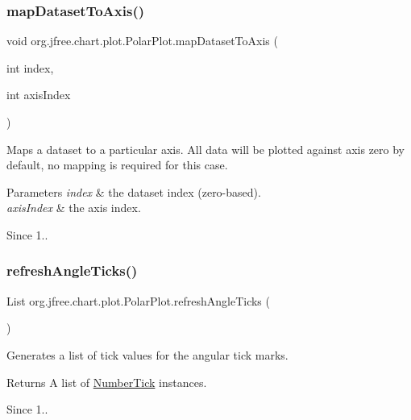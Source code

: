 \subsubsection{\texorpdfstring{map\+Dataset\+To\+Axis()}{mapDatasetToAxis()}}
{\footnotesize\ttfamily void org.\+jfree.\+chart.\+plot.\+Polar\+Plot.\+map\+Dataset\+To\+Axis (\begin{DoxyParamCaption}\item[{int}]{index,  }\item[{int}]{axis\+Index }\end{DoxyParamCaption})}

Maps a dataset to a particular axis. All data will be plotted against axis zero by default, no mapping is required for this case.


\begin{DoxyParams}{Parameters}
{\em index} & the dataset index (zero-\/based). \\
\hline
{\em axis\+Index} & the axis index.\\
\hline
\end{DoxyParams}
\begin{DoxySince}{Since}
1.. 
\end{DoxySince}
\mbox{\label{classorg_1_1jfree_1_1chart_1_1plot_1_1_polar_plot_a051265d6d552b2c20c6baac9fb02dcbe}} 
\subsubsection{\texorpdfstring{refresh\+Angle\+Ticks()}{refreshAngleTicks()}}
{\footnotesize\ttfamily List org.\+jfree.\+chart.\+plot.\+Polar\+Plot.\+refresh\+Angle\+Ticks (\begin{DoxyParamCaption}{ }\end{DoxyParamCaption})\hspace{0.3cm}{\ttfamily [protected]}}

Generates a list of tick values for the angular tick marks.

\begin{DoxyReturn}{Returns}
A list of \mbox{\hyperlink{}{Number\+Tick}} instances.
\end{DoxyReturn}
\begin{DoxySince}{Since}
1.. 
\end{DoxySince}
\mbox{\label{classorg_1_1jfree_1_1chart_1_1plot_1_1_polar_plot_afc5eb6abe8def313fb7bf1694134c0ac}} 
